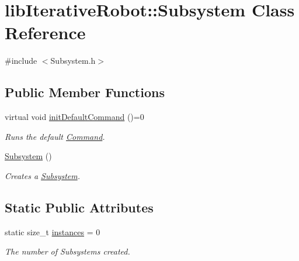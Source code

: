 \hypertarget{classlib_iterative_robot_1_1_subsystem}{}\section{lib\+Iterative\+Robot\+::Subsystem Class Reference}
\label{classlib_iterative_robot_1_1_subsystem}


{\ttfamily \#include $<$Subsystem.\+h$>$}

\subsection*{Public Member Functions}
\begin{DoxyCompactItemize}
\item 
\mbox{\label{classlib_iterative_robot_1_1_subsystem_a957383df386cc39b2584143918fd67ed}} 
virtual void \mbox{\hyperlink{classlib_iterative_robot_1_1_subsystem_a957383df386cc39b2584143918fd67ed}{init\+Default\+Command}} ()=0
\begin{DoxyCompactList}\small\item\em Runs the default \mbox{\hyperlink{classlib_iterative_robot_1_1_command}{Command}}. \end{DoxyCompactList}\item 
\mbox{\hyperlink{classlib_iterative_robot_1_1_subsystem_abdec44abe9ddba76f65abb02f8f62992}{Subsystem}} ()
\begin{DoxyCompactList}\small\item\em Creates a \mbox{\hyperlink{classlib_iterative_robot_1_1_subsystem}{Subsystem}}. \end{DoxyCompactList}\end{DoxyCompactItemize}
\subsection*{Static Public Attributes}
\begin{DoxyCompactItemize}
\item 
\mbox{\label{classlib_iterative_robot_1_1_subsystem_a8520e50bb977676222daa241e757ab33}} 
static size\+\_\+t \mbox{\hyperlink{classlib_iterative_robot_1_1_subsystem_a8520e50bb977676222daa241e757ab33}{instances}} = 0
\begin{DoxyCompactList}\small\item\em The number of Subsystems created. \end{DoxyCompactList}\end{DoxyCompactItemize}
